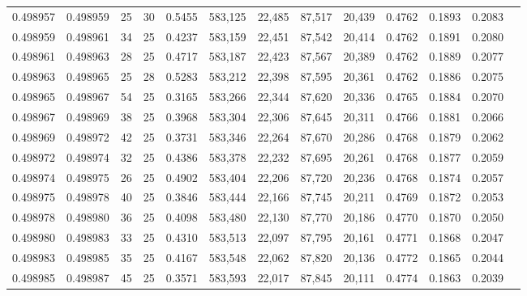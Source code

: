 \begin{tabular}{rrrrrrrrrrrrr}
0.498957 & 0.498959 &    25 &  30 &                                     0.5455 & 583,125 &  22,485 &  87,517 &  20,439 & 0.4762 & 0.1893 & 0.2083 \\
0.498959 & 0.498961 &    34 &  25 &                                     0.4237 & 583,159 &  22,451 &  87,542 &  20,414 & 0.4762 & 0.1891 & 0.2080 \\
0.498961 & 0.498963 &    28 &  25 &                                     0.4717 & 583,187 &  22,423 &  87,567 &  20,389 & 0.4762 & 0.1889 & 0.2077 \\
0.498963 & 0.498965 &    25 &  28 &                                     0.5283 & 583,212 &  22,398 &  87,595 &  20,361 & 0.4762 & 0.1886 & 0.2075 \\
0.498965 & 0.498967 &    54 &  25 &                                     0.3165 & 583,266 &  22,344 &  87,620 &  20,336 & 0.4765 & 0.1884 & 0.2070 \\
0.498967 & 0.498969 &    38 &  25 &                                     0.3968 & 583,304 &  22,306 &  87,645 &  20,311 & 0.4766 & 0.1881 & 0.2066 \\
0.498969 & 0.498972 &    42 &  25 &                                     0.3731 & 583,346 &  22,264 &  87,670 &  20,286 & 0.4768 & 0.1879 & 0.2062 \\
0.498972 & 0.498974 &    32 &  25 &                                     0.4386 & 583,378 &  22,232 &  87,695 &  20,261 & 0.4768 & 0.1877 & 0.2059 \\
0.498974 & 0.498975 &    26 &  25 &                                     0.4902 & 583,404 &  22,206 &  87,720 &  20,236 & 0.4768 & 0.1874 & 0.2057 \\
0.498975 & 0.498978 &    40 &  25 &                                     0.3846 & 583,444 &  22,166 &  87,745 &  20,211 & 0.4769 & 0.1872 & 0.2053 \\
0.498978 & 0.498980 &    36 &  25 &                                     0.4098 & 583,480 &  22,130 &  87,770 &  20,186 & 0.4770 & 0.1870 & 0.2050 \\
0.498980 & 0.498983 &    33 &  25 &                                     0.4310 & 583,513 &  22,097 &  87,795 &  20,161 & 0.4771 & 0.1868 & 0.2047 \\
0.498983 & 0.498985 &    35 &  25 &                                     0.4167 & 583,548 &  22,062 &  87,820 &  20,136 & 0.4772 & 0.1865 & 0.2044 \\
0.498985 & 0.498987 &    45 &  25 &                                     0.3571 & 583,593 &  22,017 &  87,845 &  20,111 & 0.4774 & 0.1863 & 0.2039 \\

\end{tabular}
